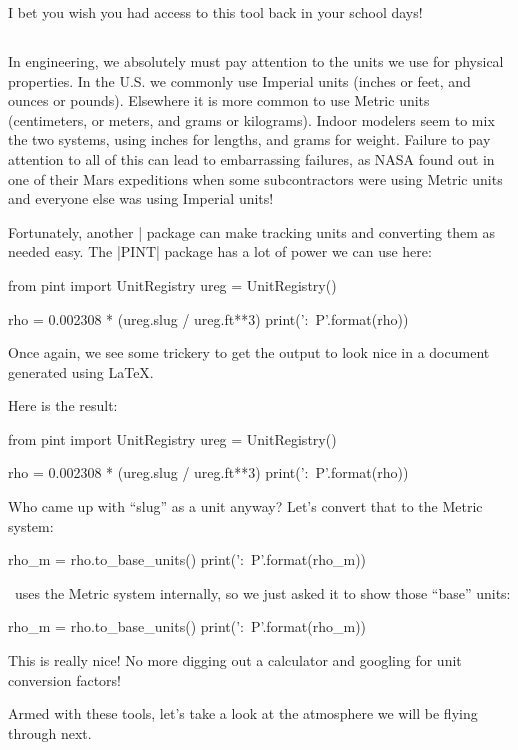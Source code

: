 I bet you wish you had access to this tool back in your school days!

\subsection{\PINT}

In engineering, we absolutely must pay attention to the units we use for
physical properties. In the U.S. we commonly use Imperial units (inches or
feet, and ounces or pounds). Elsewhere it is more common to use Metric units
(centimeters, or meters, and grams or kilograms). Indoor modelers seem to mix
the two systems, using inches for lengths, and grams for weight. Failure to pay
attention to all of this can lead to embarrassing failures, as NASA found out in
one of their Mars expeditions when some subcontractors were using Metric units
and everyone else was using Imperial units!

Fortunately, another \PY| package can make tracking units and converting them
as needed easy. The |PINT| package has a lot of power we can use here:

\begin{pyblock}
from pint import UnitRegistry
ureg = UnitRegistry()

rho = 0.002308 * (ureg.slug / ureg.ft**3)
print('{:~P}'.format(rho))
\end{pyblock}

Once again, we see some trickery to get the output to look nice in a document generated using \LaTeX.

Here is the result:

\begin{pycode}
from pint import UnitRegistry
ureg = UnitRegistry()

rho = 0.002308 * (ureg.slug / ureg.ft**3)
print('{:~P}'.format(rho))

\end{pycode}

Who came up with ``slug'' as a unit anyway? Let's convert that to the Metric system:

\begin{pyblock}
rho_m = rho.to_base_units()
print('{:~P}'.format(rho_m))
\end{pyblock}

\PINT\ uses the Metric system internally, so we just asked it to show those
``base'' units:

\begin{pycode}
rho_m = rho.to_base_units()
print('{:~P}'.format(rho_m))
\end{pycode}

This is really nice! No more digging out a calculator and googling for unit
conversion factors!

Armed with these tools, let's take a look at the atmosphere we will be flying
through next.
